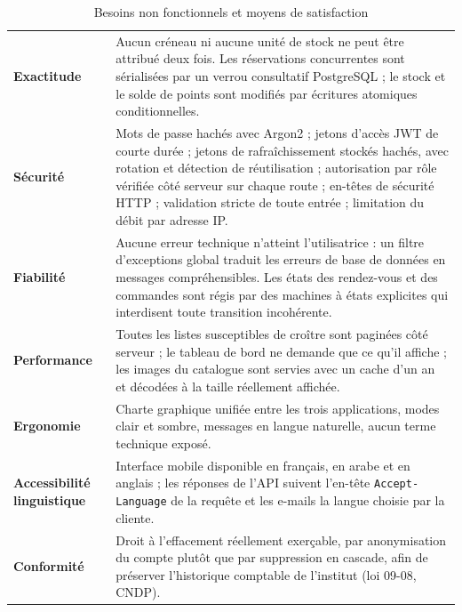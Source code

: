 \begin{table}[H]
\centering
\caption{Besoins non fonctionnels et moyens de satisfaction}
\label{tab:besoins-non-fonctionnels}
\begin{tabularx}{\textwidth}{L{3.1cm} X}
\toprule
{} &  \\
\midrule
\textbf{Exactitude} &
Aucun créneau ni aucune unité de stock ne peut être attribué deux fois. Les
réservations concurrentes sont sérialisées par un verrou consultatif
PostgreSQL ; le stock et le solde de points sont modifiés par écritures
atomiques conditionnelles. \\

\textbf{Sécurité} &
Mots de passe hachés avec Argon2 ; jetons d'accès JWT de courte durée ; jetons
de rafraîchissement stockés hachés, avec rotation et détection de réutilisation ;
autorisation par rôle vérifiée côté serveur sur chaque route ; en-têtes de
sécurité HTTP ; validation stricte de toute entrée ; limitation du débit par
adresse IP. \\

\textbf{Fiabilité} &
Aucune erreur technique n'atteint l'utilisatrice : un filtre d'exceptions
global traduit les erreurs de base de données en messages compréhensibles.
Les états des rendez-vous et des commandes sont régis par des machines à états
explicites qui interdisent toute transition incohérente. \\

\textbf{Performance} &
Toutes les listes susceptibles de croître sont paginées côté serveur ; le
tableau de bord ne demande que ce qu'il affiche ; les images du catalogue sont
servies avec un cache d'un an et décodées à la taille réellement affichée. \\

\textbf{Ergonomie} &
Charte graphique unifiée entre les trois applications, modes clair et sombre,
messages en langue naturelle, aucun terme technique exposé. \\

\textbf{Accessibilité linguistique} &
Interface mobile disponible en français, en arabe et en anglais ; les réponses
de l'API suivent l'en-tête \texttt{Accept-Language} de la requête et les
e-mails la langue choisie par la cliente. \\

\textbf{Conformité} &
Droit à l'effacement réellement exerçable, par anonymisation du compte plutôt
que par suppression en cascade, afin de préserver l'historique comptable de
l'institut (loi 09-08, CNDP). \\
\bottomrule
\end{tabularx}
\end{table}

